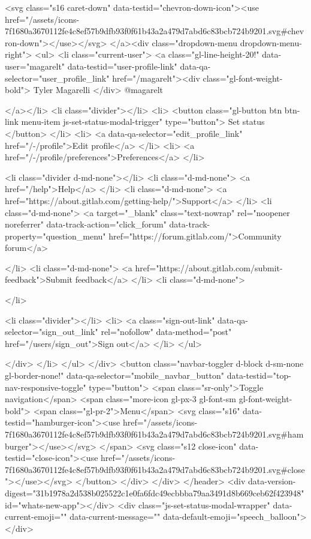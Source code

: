 {{<svg class="s16 caret-down" data-testid="chevron-down-icon"><use href="/assets/icons-7f1680a3670112fe4c8ef57b9dfb93f0f61b43a2a479d7abd6c83bcb724b9201.svg#chevron-down"></use></svg>
</a><div class="dropdown-menu dropdown-menu-right">
<ul>
<li class="current-user">
<a class="gl-line-height-20!" data-user="magarelt" data-testid="user-profile-link" data-qa-selector="user_profile_link" href="/magarelt"><div class="gl-font-weight-bold">
Tyler Magarelli
</div>
@magarelt

</a></li>
<li class="divider"></li>
<li>
<button class="gl-button btn btn-link menu-item js-set-status-modal-trigger" type="button">
Set status
</button>
</li>
<li>
<a data-qa-selector="edit_profile_link" href="/-/profile">Edit profile</a>
</li>
<li>
<a href="/-/profile/preferences">Preferences</a>
</li>


<li class="divider d-md-none"></li>
<li class="d-md-none">
<a href="/help">Help</a>
</li>
<li class="d-md-none">
<a href="https://about.gitlab.com/getting-help/">Support</a>
</li>
<li class="d-md-none">
<a target="_blank" class="text-nowrap" rel="noopener noreferrer" data-track-action="click_forum" data-track-property="question_menu" href="https://forum.gitlab.com/">Community forum</a>

</li>
<li class="d-md-none">
<a href="https://about.gitlab.com/submit-feedback">Submit feedback</a>
</li>
<li class="d-md-none">

</li>

<li class="divider"></li>
<li>
<a class="sign-out-link" data-qa-selector="sign_out_link" rel="nofollow" data-method="post" href="/users/sign_out">Sign out</a>
</li>
</ul>

</div>
</li>
</ul>
</div>
<button class="navbar-toggler d-block d-sm-none gl-border-none!" data-qa-selector="mobile_navbar_button" data-testid="top-nav-responsive-toggle" type="button">
<span class="sr-only">Toggle navigation</span>
<span class="more-icon gl-px-3 gl-font-sm gl-font-weight-bold">
<span class="gl-pr-2">Menu</span>
<svg class="s16" data-testid="hamburger-icon"><use href="/assets/icons-7f1680a3670112fe4c8ef57b9dfb93f0f61b43a2a479d7abd6c83bcb724b9201.svg#hamburger"></use></svg>
</span>
<svg class="s12 close-icon" data-testid="close-icon"><use href="/assets/icons-7f1680a3670112fe4c8ef57b9dfb93f0f61b43a2a479d7abd6c83bcb724b9201.svg#close"></use></svg>
</button>
</div>
</div>
</header>
<div data-version-digest="31b1978a2d538b025522c1e0fa6fdc49ecbbba79aa3491d8b669ceb62f423948" id="whats-new-app"></div>
<div class="js-set-status-modal-wrapper" data-current-emoji="" data-current-message="" data-default-emoji="speech_balloon"></div>

}}

